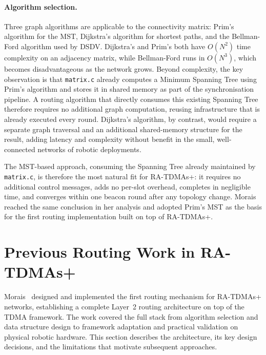 \paragraph{Algorithm selection.}
Three graph algorithms are applicable to the connectivity matrix: Prim's algorithm for the
MST, Dijkstra's algorithm for shortest paths, and the Bellman-Ford algorithm used by DSDV.
Dijkstra's and Prim's both have $O(N^2)$ time complexity on an adjacency matrix, while
Bellman-Ford runs in $O(N^3)$, which becomes disadvantageous as the network grows.
Beyond complexity, the key observation is that \texttt{matrix.c} already computes a Minimum
Spanning Tree using Prim's algorithm and stores it in shared memory as part of the
synchronisation pipeline. A routing algorithm that directly consumes this existing Spanning
Tree therefore requires no additional graph computation, reusing infrastructure that is already
executed every round. Dijkstra's algorithm, by contrast, would require a separate graph
traversal and an additional shared-memory structure for the result, adding latency and
complexity without benefit in the small, well-connected networks of robotic deployments.

The MST-based approach, consuming the Spanning Tree already maintained by
\texttt{matrix.c}, is therefore the most natural fit for RA-TDMAs+: it requires no additional
control messages, adds no per-slot overhead, completes in negligible time, and converges within
one beacon round after any topology change. Morais~\cite{morais2024synchronization}
reached the same conclusion in her analysis and adopted Prim's MST as the basis for the first
routing implementation built on top of RA-TDMAs+.


\section{Previous Routing Work in RA-TDMAs+}
\label{sec:related-work}

Morais~\cite{morais2024synchronization} designed and implemented the first routing mechanism
for RA-TDMAs+ networks, establishing a complete Layer~2 routing architecture on top of the
TDMA framework. The work covered the full stack from algorithm selection and data structure
design to framework adaptation and practical validation on physical robotic hardware. This
section describes the architecture, its key design decisions, and the limitations that motivate
subsequent approaches.

